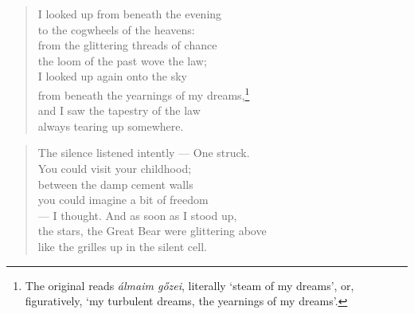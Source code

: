 
\begin{verse}
  I looked up from beneath the evening \\
  to the cogwheels of the heavens: \\
  from the glittering threads of chance \\
  the loom of the past wove the law; \\
  I looked up again onto the sky \\
  from beneath the yearnings of my dreams,\footnote{The
original reads \emph{álmaim gőzei}, literally `steam of my dreams',
or, figuratively, `my turbulent dreams, the yearnings of my dreams'.} \\
  and I saw the tapestry of the law \\
  always tearing up somewhere.
\end{verse}

\bigskip



\begin{verse}
  The silence listened intently --- One struck. \\
  You could visit your childhood; \\
  between the damp cement walls \\
  you could imagine a bit of freedom \\
  --- I thought. And as soon as I stood up, \\
  the stars, the Great Bear were glittering above\\
  like the grilles up in the silent cell.
\end{verse}

\newpage


\vspace*{-15mm}
\centeredornament




